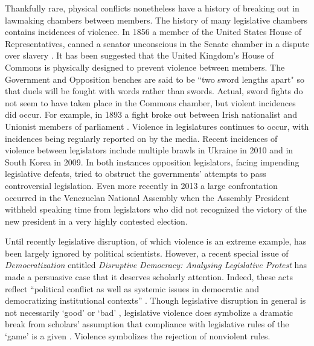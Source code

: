 \documentclass[a4paper]{article}\usepackage{graphicx, color}
\begin{document}
Thankfully rare, physical conflicts nonetheless have a history of breaking out in lawmaking chambers between members. The history of many legislative chambers contains incidences of violence. In 1856 a member of the United States House of Representatives, canned a senator unconscious in the Senate chamber in a dispute over slavery \citep{USSenateCanning}. It has been suggested that the United Kingdom's House of Commons is physically designed to prevent violence between members. The Government and Opposition benches are said to be ``two sword lengths apart" \citep{ParliamentUKSword} so that duels will be fought with words rather than swords. Actual, sword fights do not seem to have taken place in the Commons chamber, but violent incidences did occur. For example, in 1893 a fight broke out between Irish nationalist and Unionist members of parliament \citep{ByrneViolence}. Violence in legislatures continues to occur, with incidences being regularly reported on by the media. Recent incidences of violence between legislators include multiple brawls in Ukraine in 2010 and in South Korea in 2009. In both instances opposition legislators, facing impending legislative defeats, tried to obstruct the governments' attempts to pass controversial legislation. Even more recently in 2013 a large confrontation occurred in the Venezuelan National Assembly when the Assembly President withheld speaking time from legislators who did not recognized the victory of the new president in a very highly contested election.

Until recently legislative disruption, of which violence is an extreme example, has been largely ignored by political scientists. However, a recent special issue of \emph{Democratization} \citeyearpar{Democratization2013} entitled \emph{Disruptive Democracy: Analysing Legislative Protest} has made a persuasive case that it deserves scholarly attention. Indeed, these acts reflect ``political conflict as well as systemic issues in democratic and democratizing institutional contexts'' \citep[394-395]{Spary2013}. Though legislative disruption in general is not necessarily `good' or `bad' \citep[see][for discussions of how disruption may be a `safety valve' in contexts where dissent is strongly curtailed]{Ostrow1996,Young2002}, legislative violence does symbolize a dramatic break from scholars' assumption that compliance with legislative rules of the `game' is a given \cite{Wolfe2004}. Violence symbolizes the rejection of nonviolent rules. 
\end{document}
